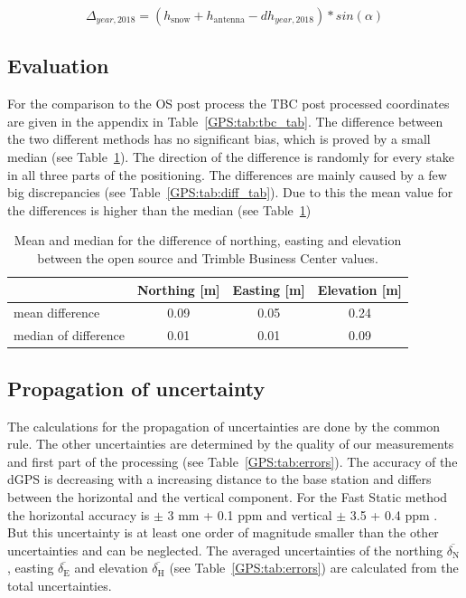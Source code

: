 \begin{equation}
	\Delta_{year,2018} = (h_{\text{snow}} + h_{\text{antenna}} - dh_{year,2018}) * sin(\alpha)
\end{equation}

\subsection{Evaluation}
For the comparison to the OS post process the TBC post processed coordinates are given in the appendix in Table~\ref{GPS:tab:tbc_tab}.
The difference between the two different methods has no significant bias, which is proved by a small median (see Table~\ref{GPS:tab:diff}).
The direction of the difference is randomly for every stake in all three parts of the positioning.
The differences are mainly caused by a few big discrepancies (see Table~\ref{GPS:tab:diff_tab}).
Due to this the mean value for the differences is higher than the median (see Table~\ref{GPS:tab:diff}) 

\begin{table}[h]
	\caption{Mean and median for the difference of northing, easting and elevation between the open source and Trimble Business Center values.}
	\centering
	\begin{tabular}{lccc}
	\toprule         
      &  Northing [m] & Easting [m] & Elevation [m] \\
	\midrule
    mean difference &  0.09 & 0.05 & 0.24 \\
    median of difference & 0.01 & 0.01 & 0.09 \\
    \bottomrule
	\end{tabular}
	\label{GPS:tab:diff}
\end{table}

\subsection{Propagation of uncertainty}

The calculations for the propagation of uncertainties are done by the common rule.
The other uncertainties are determined by the quality of our measurements and first part of the processing (see Table~\ref{GPS:tab:errors}).
The accuracy of the dGPS is decreasing with a increasing distance to the base station and differs between the horizontal and the vertical component.
For the Fast Static method the horizontal accuracy is $ \pm $ 3 mm + 0.1 ppm and vertical $ \pm $ 3.5 + 0.4 ppm  \citep{Trquickstart}.
But this uncertainty is at least one order of magnitude smaller than the other uncertainties and can be neglected. 
The averaged uncertainties of the northing $ \overline{\delta_{\text{N}}} $, easting $ \overline{\delta_{\text{E}}} $ and elevation $ \overline{\delta_{\text{H}}} $ (see Table~\ref{GPS:tab:errors}) are calculated from the total uncertainties.

